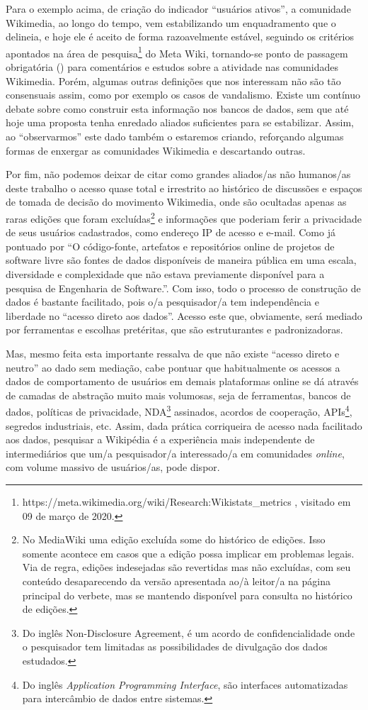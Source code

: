 Para o exemplo acima, de criação do indicador ``usuários ativos'', a comunidade Wikimedia, ao longo do tempo, vem estabilizando um enquadramento que o delineia, e hoje ele é aceito de forma razoavelmente estável, seguindo os critérios apontados na área de pesquisa\footnote{https://meta.wikimedia.org/wiki/Research:Wikistats\_metrics , visitado em 09 de março de 2020.} do Meta Wiki, tornando-se ponto de passagem obrigatória (\cite{latour_ciencia_1987}) para comentários e estudos sobre a atividade nas comunidades Wikimedia. Porém, algumas outras definições que nos interessam não são tão consensuais assim, como por exemplo os casos de vandalismo. Existe um contínuo debate sobre como construir esta informação nos bancos de dados, sem que até hoje uma proposta tenha enredado aliados suficientes para se estabilizar. Assim, ao ``observarmos'' este dado também o estaremos criando, reforçando algumas formas de enxergar as comunidades Wikimedia e descartando outras.

Por fim, não podemos deixar de citar como grandes aliados/as não humanos/as deste trabalho o acesso quase total e irrestrito ao histórico de discussões e espaços de tomada de decisão do movimento Wikimedia, onde são ocultadas apenas as raras edições que foram excluídas\footnote{No MediaWiki uma edição excluída some do histórico de edições. Isso somente acontece em casos que a edição possa implicar em problemas legais. Via de regra, edições indesejadas são revertidas mas não excluídas, com seu conteúdo desaparecendo da versão apresentada ao/à leitor/a na página principal do verbete, mas se mantendo disponível para consulta no histórico de edições.} e informações que poderiam ferir a privacidade de seus usuários cadastrados, como endereço IP de acesso e e-mail. Como já pontuado por \citep[p. 318]{scacchi_future_2010} ``O código-fonte, artefatos e repositórios online de projetos de software livre são fontes de dados disponíveis de maneira pública em uma escala, diversidade e complexidade que não estava previamente disponível para a pesquisa de Engenharia de Software.''. Com isso, todo o processo de construção de dados é bastante facilitado, pois o/a pesquisador/a tem independência e liberdade no ``acesso direto aos dados''. Acesso este que, obviamente, será mediado por ferramentas e escolhas pretéritas, que são  estruturantes e padronizadoras.

Mas, mesmo feita esta importante ressalva de que não existe ``acesso direto e neutro'' ao dado sem mediação, cabe pontuar que habitualmente os acessos a dados de comportamento de usuários em demais plataformas online se dá através de camadas de abstração muito mais volumosas, seja de ferramentas, bancos de dados, políticas de privacidade, NDA\footnote{Do inglês Non-Disclosure Agreement, é um acordo de confidencialidade onde o pesquisador tem limitadas as possibilidades de divulgação dos dados estudados.} assinados, acordos de cooperação, APIs\footnote{Do inglês \textit{Application Programming Interface}, são interfaces automatizadas para intercâmbio de dados entre sistemas.}, segredos industriais, etc. Assim, dada prática corriqueira de acesso nada facilitado aos dados, pesquisar a Wikipédia é a experiência mais independente de intermediários que um/a pesquisador/a interessado/a em comunidades \textit{online}, com volume massivo de usuários/as, pode dispor.